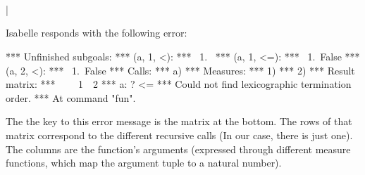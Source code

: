 \begin{isabellebody}
\begin{isamarkuptext}
\end{isamarkuptext}  
 \\%
\\%
\hspace*{2ex}\\%
|\hspace*{1.5ex}\\
\begin{isamarkuptext}

\noindent Isabelle responds with the following error:

\begin{isabelle}
*** Unfinished subgoals:\newline
*** (a, 1, <):\newline
*** \ 1.~\newline
*** (a, 1, <=):\newline
*** \ 1.~False\newline
*** (a, 2, <):\newline
*** \ 1.~False\newline
*** Calls:\newline
*** a) \newline
*** Measures:\newline
*** 1) \newline
*** 2) \newline
*** Result matrix:\newline
*** \ \ \ \ 1\ \ 2  \newline
*** a:  ?   <= \newline
*** Could not find lexicographic termination order.\newline
*** At command "fun".\newline
\end{isabelle}%
\end{isamarkuptext}%
\isamarkuptrue%
%
\begin{isamarkuptext}%
The the key to this error message is the matrix at the bottom. The rows
  of that matrix correspond to the different recursive calls (In our
  case, there is just one). The columns are the function's arguments 
  (expressed through different measure functions, which map the
  argument tuple to a natural number). 


\end{isamarkuptext}
\end{isabellebody}
